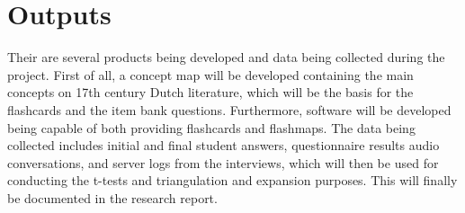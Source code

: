 \section{Outputs}


Their are several products being developed and data being collected during the project. First of all, a concept map will be developed containing the main concepts on 17th century Dutch literature, which will be the basis for the flashcards and the item bank questions. Furthermore, software will be developed being capable of both providing flashcards and flashmaps. The data being collected includes initial and final student answers, questionnaire results audio conversations, and server logs from the interviews, which will then be used for conducting the t-tests and triangulation and expansion purposes. This will finally be documented in the research report.
